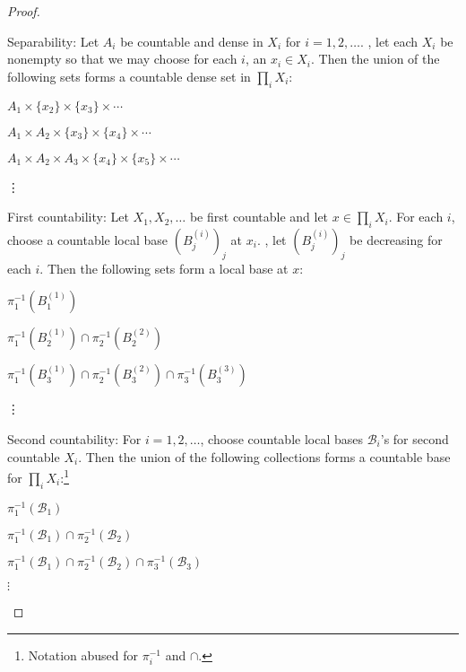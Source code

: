 	\begin{proof}
		\begin{mylist}
			\item Separability:
			Let $A_i$ be countable and dense in $X_i$ for $i = 1, 2, \ldots$. \Wlogg, let each $X_i$ be nonempty so that we may choose
			 for each $i$, an $x_i\in X_i$. Then the union of the following sets forms a countable dense set in $\prod_i X_i$:
			\begin{mylist}
				\item $A_1\times\{x_2\}\times\{x_3\}\times\cdots$
				\item $A_1\times A_2\times \{x_3\}\times\{x_4\}\times\cdots$
				\item $A_1\times A_2\times A_3\times \{x_4\}\times\{x_5\}\times\cdots$
				\item[\vdots] 
			\end{mylist}
			
			\item First countability:
			Let $X_1, X_2, \ldots$ be first countable and let $x\in \prod_i X_i$. For each $i$, choose a countable local base $(B^{(i)}_j)_j$ at $x_i$. \Wlogg, let $(B^{(i)}_j)_j$ be decreasing for each $i$. Then the following sets form a local base at $x$:
			\begin{mylist}
				\item $\pi_1^{-1}(B^{(1)}_1)$
				\item $\pi_1^{-1}(B^{(1)}_2)\cap \pi_2^{-1}(B^{(2)}_2)$
				\item $\pi_1^{-1}(B^{(1)}_3)\cap \pi_2^{-1}(B^{(2)}_3)\cap \pi_3^{-1}(B^{(3)}_3)$
				\item[\vdots]
			\end{mylist}
			
			\item Second countability: 
			For $i = 1, 2, \ldots$, choose countable local bases $\mathscr B_i$'s for second countable $X_i$. Then the union of the following collections forms a countable base for $\prod_i X_i$:\footnote{Notation abused for $\pi_i^{-1}$ and $\cap$.}
			\begin{mylist}
				\item $\pi_1^{-1}(\mathscr B_1)$
				\item $\pi_1^{-1}(\mathscr B_1)\cap\pi_2^{-1}(\mathscr B_2)$
				\item $\pi_1^{-1}(\mathscr B_1)\cap\pi_2^{-1}(\mathscr B_2)\cap\pi_3^{-1}(\mathscr B_3)$
				\item[$\vdots$]\qedhere
			\end{mylist}
		\end{mylist}
	\end{proof}
	
